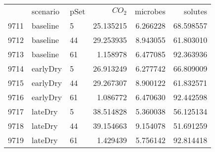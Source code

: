 \begin{tabular}{lllrrr}
 & scenario & pSet & $CO_2$ & microbes & solutes \\
9711 & baseline & 5 & 25.135215 & 6.266228 & 68.598557 \\
9712 & baseline & 44 & 29.253935 & 8.943055 & 61.803010 \\
9713 & baseline & 61 & 1.158978 & 6.477085 & 92.363936 \\
9714 & earlyDry & 5 & 26.913249 & 6.277742 & 66.809009 \\
9715 & earlyDry & 44 & 29.267307 & 8.900122 & 61.832571 \\
9716 & earlyDry & 61 & 1.086772 & 6.470630 & 92.442598 \\
9717 & lateDry & 5 & 38.514828 & 5.360038 & 56.125134 \\
9718 & lateDry & 44 & 39.154663 & 9.154078 & 51.691259 \\
9719 & lateDry & 61 & 1.429439 & 5.756142 & 92.814418 \\
\end{tabular}
